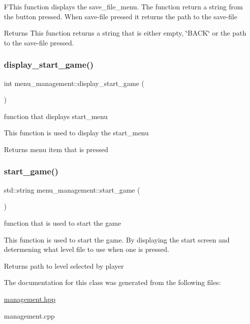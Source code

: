 F\+This function displays the save\+\_\+file\+\_\+menu. The function return a string from the button pressed. When save-\/file pressed it returns the path to the save-\/file

\begin{DoxyReturn}{Returns}
This function returns a string that is either empty, \char`\"{}\+B\+A\+C\+K\char`\"{} or the path to the save-\/file pressed. 
\end{DoxyReturn}
\mbox{\label{classmenu__management_aad6e975e03cab2478f3ebec8da7eaf7d}} 
\subsubsection{\texorpdfstring{display\+\_\+start\+\_\+game()}{display\_start\_game()}}
{\footnotesize\ttfamily int menu\+\_\+management\+::display\+\_\+start\+\_\+game (\begin{DoxyParamCaption}{ }\end{DoxyParamCaption})}



function that displays start\+\_\+menu 

This function is used to display the start\+\_\+menu

\begin{DoxyReturn}{Returns}
menu item that is pressed 
\end{DoxyReturn}
\mbox{\label{classmenu__management_a92d22f059d33ccc5c3ae485804fd5fbb}} 
\subsubsection{\texorpdfstring{start\+\_\+game()}{start\_game()}}
{\footnotesize\ttfamily std\+::string menu\+\_\+management\+::start\+\_\+game (\begin{DoxyParamCaption}{ }\end{DoxyParamCaption})}



function that is used to start the game 

This function is used to start the game. By displaying the start screen and determening what level file to use when one is pressed.

\begin{DoxyReturn}{Returns}
path to level selected by player 
\end{DoxyReturn}


The documentation for this class was generated from the following files\+:\begin{DoxyCompactItemize}
\item 
\hyperlink{management_8hpp}{management.\+hpp}\item 
management.\+cpp\end{DoxyCompactItemize}
